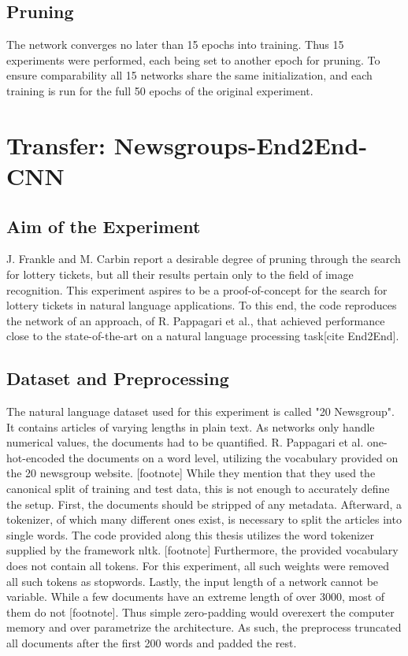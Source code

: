 \subsection*{Pruning}
The network converges no later than 15 epochs into training. Thus 15 experiments were performed, each being set to another epoch for pruning. 
To ensure comparability all 15 networks share the same initialization, and each training is run for the full  50 epochs of the original experiment.


\section{Transfer: Newsgroups-End2End-CNN}

\subsection*{Aim of the Experiment}
J. Frankle and M. Carbin report a desirable degree of pruning through the search for lottery tickets, but all their results pertain only to the field of image recognition. This experiment aspires to be a proof-of-concept for the search for lottery tickets in natural language applications. To this end, the code reproduces the network of an approach, of R. Pappagari et al.,  that achieved performance close to the state-of-the-art on a natural language processing task[cite End2End].

\subsection*{Dataset and Preprocessing}
The natural language dataset used for this experiment is called "20 Newsgroup". It contains articles of varying lengths in plain text. As networks only handle numerical values, the documents had to be quantified. R. Pappagari et al. one-hot-encoded the documents on a word level, utilizing the vocabulary provided on the 20 newsgroup website. [footnote] 
While they mention that they used the canonical split of training and test data, this is not enough to accurately define the setup. First, the documents should be stripped of any metadata. Afterward, a tokenizer, of which many different ones exist, is necessary to split the articles into single words. The code provided along this thesis utilizes the word tokenizer supplied by the framework nltk. [footnote] Furthermore, the provided vocabulary does not contain all tokens. For this experiment, all such weights were removed all such tokens as stopwords. 
Lastly, the input length of a network cannot be variable. While a few documents have an extreme length of over 3000, most of them do not [footnote]. Thus simple zero-padding would overexert the computer memory and over parametrize the architecture. As such, the preprocess truncated all documents after the first 200 words and padded the rest.

